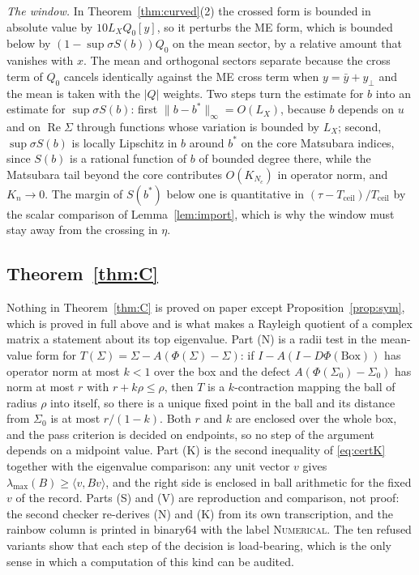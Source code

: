 \documentclass[11pt]{article}
\newcommand{\NUM}{\upshape\mdseries\textsc{Numerical}}
\newcommand{\Tceil}{T_{\mathrm{ceil}}}
\newcommand{\sS}{\sup\sigma S}
\theoremstyle{definition}
\theoremstyle{remark}
\begin{document}
\emph{The window.} In Theorem~\ref{thm:curved}(2) the crossed form is bounded in absolute value by $10L_XQ_0[y]$, so it perturbs the ME form, which is bounded below by $(1-\sS(b))Q_0$ on the mean sector, by a relative amount that vanishes with $x$. The mean and orthogonal sectors separate because the cross term of $Q_0$ cancels identically against the ME cross term when $y=\bar y+y_\perp$ and the mean is taken with the $|Q|$ weights. Two steps turn the estimate for $b$ into an estimate for $\sS(b)$: first $\|b-b^*\|_\infty=O(L_X)$, because $b$ depends on $u$ and on $\operatorname{Re}\Sigma$ through functions whose variation is bounded by $L_X$; second, $\sup\sigma S(b)$ is locally Lipschitz in $b$ around $b^*$ on the core Matsubara indices, since $S(b)$ is a rational function of $b$ of bounded degree there, while the Matsubara tail beyond the core contributes $O(K_{N_c})$ in operator norm, and $K_n\to0$. The margin of $S(b^*)$ below one is quantitative in $(\tau-\Tceil)/\Tceil$ by the scalar comparison of Lemma~\ref{lem:import}, which is why the window must stay away from the crossing in $\eta$.

\subsection{Theorem~\ref{thm:C}}

Nothing in Theorem~\ref{thm:C} is proved on paper except Proposition~\ref{prop:sym}, which is proved in full above and is what makes a Rayleigh quotient of a complex matrix a statement about its top eigenvalue. Part (N) is a radii test in the mean-value form for $T(\Sigma)=\Sigma-A(\Phi(\Sigma)-\Sigma)$: if $I-A(I-D\Phi(\mathrm{Box}))$ has operator norm at most $k<1$ over the box and the defect $A(\Phi(\Sigma_0)-\Sigma_0)$ has norm at most $r$ with $r+k\rho\le\rho$, then $T$ is a $k$-contraction mapping the ball of radius $\rho$ into itself, so there is a unique fixed point in the ball and its distance from $\Sigma_0$ is at most $r/(1-k)$. Both $r$ and $k$ are enclosed over the whole box, and the pass criterion is decided on endpoints, so no step of the argument depends on a midpoint value. Part (K) is the second inequality of \eqref{eq:certK} together with the eigenvalue comparison: any unit vector $v$ gives $\lambda_{\max}(B)\ge\langle v,Bv\rangle$, and the right side is enclosed in ball arithmetic for the fixed $v$ of the record. Parts (S) and (V) are reproduction and comparison, not proof: the second checker re-derives (N) and (K) from its own transcription, and the rainbow column is printed in binary64 with the label \NUM. The ten refused variants show that each step of the decision is load-bearing, which is the only sense in which a computation of this kind can be audited.
\end{document}
